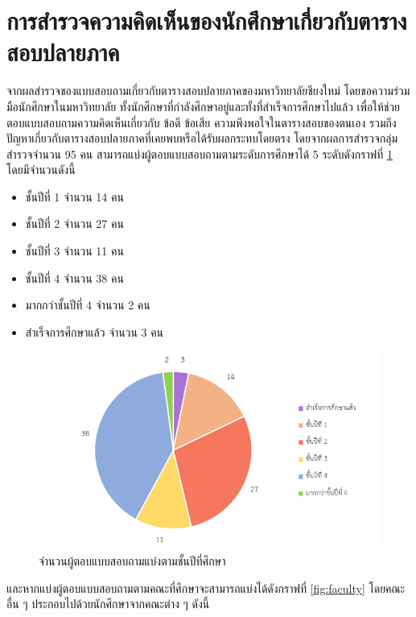 \section{การสำรวจความคิดเห็นของนักศึกษาเกี่ยวกับตารางสอบปลายภาค}
จากผลสำรวจของแบบสอบถามเกี่ยวกับตารางสอบปลายภาคของมหาวิทยาลัยชียงใหม่ โดยขอความร่วมมือนักศึกษาในมหาวิทยาลัย
ทั้งนักศึกษาที่กำลังศึกษาอยู่และทั้งที่สำเร็จการศึกษาไปแล้ว เพื่อให้ช่วยตอบแบบสอบถามความคิดเห็นเกี่ยวกับ ข้อดี ข้อเสีย ความพึงพอใจในตารางสอบของตนเอง
รวมถึงปัญหาเกี่ยวกับตารางสอบปลายภาคที่เคยพบหรือได้รับผลกระทบโดยตรง โดยจากผลการสำรวจกลุ่มสำรวจจำนวน 95 คน สามารถแบ่งผู้ตอบแบบสอบถามตามระดับการศึกษาได้ 5 ระดับดังกราฟที่ \ref{fig:academic_year} โดยมีจำนวนดังนี้
\begin{itemize}
  \item ชั้นปีที่ 1 จำนวน 14 คน
  \item ชั้นปีที่ 2 จำนวน 27 คน
  \item ชั้นปีที่ 3 จำนวน 11 คน
  \item ชั้นปีที่ 4 จำนวน 38 คน
  \item มากกว่าชั้นปีที่ 4 จำนวน 2 คน
  \item สำเร็จการศึกษาแล้ว จำนวน 3 คน
\end{itemize}
\begin{figure}
  \begin{center}
    \includegraphics[width=\linewidth]{images/group_by_academic_year.png}
  \end{center}
  \caption[จำนวนผู้ตอบแบบสอบถามแบ่งตามชั้นปีที่ศึกษา]{จำนวนผู้ตอบแบบสอบถามแบ่งตามชั้นปีที่ศึกษา}
  \label{fig:academic_year}     
\end{figure}
และหากแบ่งผู้ตอบแบบสอบถามตามคณะที่ศึกษาจะสามารถแบ่งได้ดังกราฟที่ \ref{fig:faculty} 
โดยคณะอื่น ๆ ประกอบไปด้วยนักศึกษาจากคณะต่าง ๆ ดังนี้
